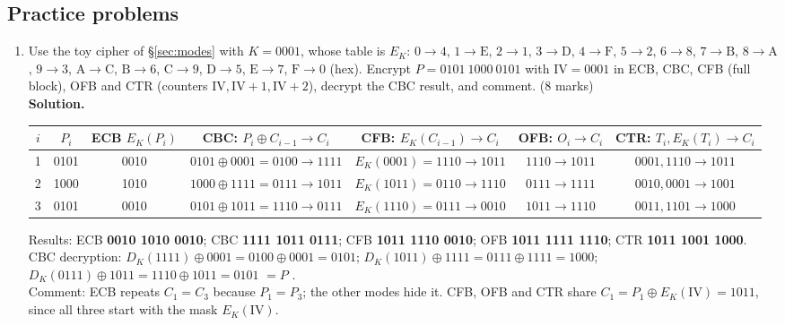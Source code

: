 \subsection*{Practice problems}
\begin{enumerate}[leftmargin=1.6em,itemsep=4pt]
  \item Use the toy cipher of \S\ref{sec:modes} with $K = 0001$, whose table is $E_K$: $0 \to 4$, $1 \to \mathrm{E}$, $2 \to 1$, $3 \to \mathrm{D}$, $4 \to \mathrm{F}$, $5 \to 2$, $6 \to 8$, $7 \to \mathrm{B}$, $8 \to \mathrm{A}$, $9 \to 3$, $\mathrm{A} \to \mathrm{C}$, $\mathrm{B} \to 6$, $\mathrm{C} \to 9$, $\mathrm{D} \to 5$, $\mathrm{E} \to 7$, $\mathrm{F} \to 0$ (hex). Encrypt $P = 0101\ 1000\ 0101$ with $\mathrm{IV} = 0001$ in ECB, CBC, CFB (full block), OFB and CTR (counters $\mathrm{IV}, \mathrm{IV}+1, \mathrm{IV}+2$), decrypt the CBC result, and comment. \hfill (8 marks)\\
  \textbf{Solution.}
  \begin{center}\small
  \begin{tabular}{@{}c c c c c c c@{}}
  \toprule
  $i$ & $P_i$ & ECB $E_K(P_i)$ & CBC: $P_i \oplus C_{i-1} \to C_i$ & CFB: $E_K(C_{i-1}) \to C_i$ & OFB: $O_i \to C_i$ & CTR: $T_i, E_K(T_i) \to C_i$\\
  \midrule
  1 & 0101 & 0010 & $0101 \oplus 0001 = 0100 \to 1111$ & $E_K(0001) = 1110 \to 1011$ & $1110 \to 1011$ & $0001, 1110 \to 1011$\\
  2 & 1000 & 1010 & $1000 \oplus 1111 = 0111 \to 1011$ & $E_K(1011) = 0110 \to 1110$ & $0111 \to 1111$ & $0010, 0001 \to 1001$\\
  3 & 0101 & 0010 & $0101 \oplus 1011 = 1110 \to 0111$ & $E_K(1110) = 0111 \to 0010$ & $1011 \to 1110$ & $0011, 1101 \to 1000$\\
  \bottomrule
  \end{tabular}
  \end{center}
  Results: ECB \textbf{0010 1010 0010}; CBC \textbf{1111 1011 0111}; CFB \textbf{1011 1110 0010}; OFB \textbf{1011 1111 1110}; CTR \textbf{1011 1001 1000}.\\
  CBC decryption: $D_K(1111) \oplus 0001 = 0100 \oplus 0001 = 0101$; $D_K(1011) \oplus 1111 = 0111 \oplus 1111 = 1000$; $D_K(0111) \oplus 1011 = 1110 \oplus 1011 = 0101$ $= P$ \checkmark.\\
  Comment: ECB repeats $C_1 = C_3$ because $P_1 = P_3$; the other modes hide it. CFB, OFB and CTR share $C_1 = P_1 \oplus E_K(\mathrm{IV}) = 1011$, since all three start with the mask $E_K(\mathrm{IV})$.


\end{enumerate}
